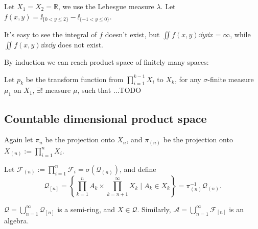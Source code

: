 \begin{example}
    Let $X_1 = X_2 = \mathbb{R}$, we use the Lebesgue measure $\lambda$.
	Let $f(x, y) = \ii_{\{0< y\le 2\}} - \ii_{\{-1 < y \le 0\}}$.

	It's easy to see the integral of $f$ doesn't exist,
	but $\iint f(x,y) \dd y\dd x = \infty$, while $\iint f(x,y)\dd x\dd y$ does
	not exist.
\end{example}

By induction we can reach product space of finitely many spaces:
\begin{theorem}
	Let $p_k$ be the transform function from $\prod_{i=1}^{k-1}X_i$ to $X_k$,
	for any $\sigma$-finite measure  $\mu_1$ on $X_1$, $\exists !$ measure $\mu$,
	such that ...TODO
\end{theorem}

\subsection{Countable dimensional product space}
\label{sub:Countable dimensional product space}
Again let $\pi_n$ be the projection onto $X_n$,
and $\pi_{(n)}$ be the projection onto $X_{(n)} := \prod_{i=1}^n X_i$.

Let $\mathscr{F}_{(n)} := \prod_{i=1}^n \mathscr{F}_i = \sigma(\mathscr{Q}_{(n)})$,
and define
\[
	\mathscr{Q}_{[n]} = \left\{\prod_{k=1}^n A_k \times \prod_{k = n+1}^\infty X_k\mid
	A_k \in X_k\right\} = \pi_{(n)}^{-1} \mathscr{Q}_{(n)}.
\]
\begin{proposition}
	$\mathscr{Q} = \bigcup_{n=1}^\infty\mathscr{Q}_{[n]}$ is a semi-ring,
	and $X\in \mathscr{Q}$.
	Similarly, $\mathscr{A} = \bigcup_{n=1}^\infty \mathscr{F}_{[n]}$ is an algebra.
\end{proposition}

